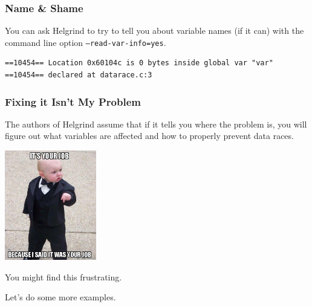 \begin{frame}[fragile]
	\frametitle{Name \& Shame}

	You can ask Helgrind to try to tell you about variable names (if it can) with the command line option \texttt{--read-var-info=yes}.

	\begin{verbatim}
==10454== Location 0x60104c is 0 bytes inside global var "var"
==10454== declared at datarace.c:3
\end{verbatim}

\end{frame}

\begin{frame}
	\frametitle{Fixing it Isn't My Problem}


	The authors of Helgrind assume that if it tells you where the problem is, you will figure out what variables are affected and how to properly prevent data races.

	\begin{center}
		\includegraphics[width=0.3\textwidth]{images/its-your-job.jpg}
	\end{center}

	You might find this frustrating.

	Let's do some more examples.

\end{frame}



